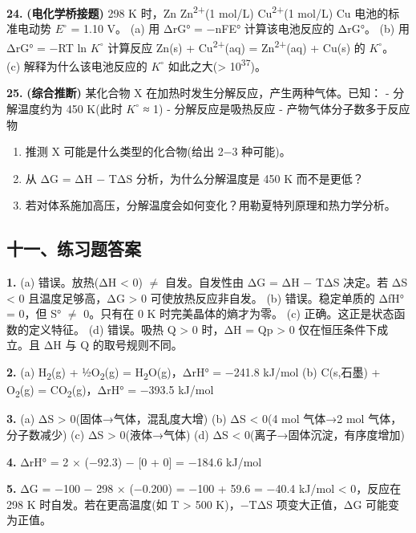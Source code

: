 \textbf{24.} \textbf{(电化学桥接题)} 298 K 时，Zn \textbar{} Zn\textsuperscript{2+}(1 mol/L) \textbar\textbar{} Cu\textsuperscript{2+}(1 mol/L) \textbar{} Cu 电池的标准电动势 \(E^{\circ}\) = 1.10 V。
(a) 用 ΔrG° = −nFE° 计算该电池反应的 ΔrG°。
(b) 用 ΔrG° = −RT ln \(K^{\circ}\) 计算反应 Zn(s) + Cu\textsuperscript{2+}(aq) = Zn\textsuperscript{2+}(aq) + Cu(s) 的 \(K^{\circ}\)。
(c) 解释为什么该电池反应的 \(K^{\circ}\) 如此之大(\textgreater{} 10\textsuperscript{37})。

\textbf{25.} \textbf{(综合推断)} 某化合物 X 在加热时发生分解反应，产生两种气体。已知：
- 分解温度约为 450 K(此时 \(K^{\circ}\) ≈ 1)
- 分解反应是吸热反应
- 产物气体分子数多于反应物

\begin{enumerate}
\def\labelenumi{(\alph{enumi})}
\tightlist
\item
  推测 X 可能是什么类型的化合物(给出 2−3 种可能)。
\item
  从 ΔG = ΔH − TΔS 分析，为什么分解温度是 450 K 而不是更低？
\item
  若对体系施加高压，分解温度会如何变化？用勒夏特列原理和热力学分析。
\end{enumerate}

\subsection{十一、练习题答案}\label{ux5341ux4e00ux7ec3ux4e60ux9898ux7b54ux6848}

\textbf{1.}
(a) 错误。放热(ΔH \textless{} 0) \(\neq\) 自发。自发性由 ΔG = ΔH − TΔS 决定。若 ΔS \textless{} 0 且温度足够高，ΔG \textgreater{} 0 可使放热反应非自发。
(b) 错误。稳定单质的 ΔfH° = 0，但 S° \(\neq\) 0。只有在 0 K 时完美晶体的熵才为零。
(c) 正确。这正是状态函数的定义特征。
(d) 错误。吸热 Q \textgreater{} 0 时，ΔH = Qp \textgreater{} 0 仅在恒压条件下成立。且 ΔH 与 Q 的取号规则不同。

\textbf{2.}
(a) H\textsubscript{2}(g) + ½O\textsubscript{2}(g) = H\textsubscript{2}O(g)，ΔrH° = −241.8 kJ/mol
(b) C(s,石墨) + O\textsubscript{2}(g) = CO\textsubscript{2}(g)，ΔrH° = −393.5 kJ/mol

\textbf{3.}
(a) ΔS \textgreater{} 0(固体→气体，混乱度大增)
(b) ΔS \textless{} 0(4 mol 气体→2 mol 气体，分子数减少)
(c) ΔS \textgreater{} 0(液体→气体)
(d) ΔS \textless{} 0(离子→固体沉淀，有序度增加)

\textbf{4.} ΔrH° = 2 × (−92.3) − {[}0 + 0{]} = −184.6 kJ/mol

\textbf{5.} ΔG = −100 − 298 × (−0.200) = −100 + 59.6 = −40.4 kJ/mol \textless{} 0，反应在 298 K 时自发。若在更高温度(如 T \textgreater{} 500 K)，−TΔS 项变大正值，ΔG 可能变为正值。


